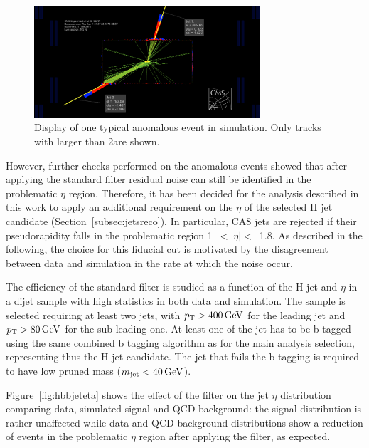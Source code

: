 \begin{figure}[!htb]
\centering
\includegraphics[width=0.75\textwidth]{Appendix/Figures/MCevent-with-tobtec.png}
\caption{Display of one typical anomalous event in simulation.
Only tracks with \pt larger than 2\GeV are shown.}
\label{fig:BadEventMC}
\end{figure}

However, further checks performed on the anomalous events showed that after applying the standard filter 
residual noise can still be identified in the problematic $\eta$ region. Therefore, it has been decided for the analysis described in this work to
apply an additional requirement on the $\eta$ of the selected H jet candidate (Section~\ref{subsec:jetsreco}).
In particular, CA8 jets are rejected if their pseudorapidity falls in the problematic region 1~$<|\eta|<$~1.8.
As described in the following, the choice for this fiducial cut is motivated by the disagreement between data and simulation in the rate
at which the noise occur.

The efficiency of the standard filter is studied as a function of the H jet \pt and $\eta$ in a dijet sample with high statistics in both data and simulation.
The sample is selected requiring at least two jets, with $p_{\mathrm{T}} > 400\,\text{Ge\hspace{-.08em}V}$ for the leading jet and $p_{\mathrm{T}} > 80\,\text{Ge\hspace{-.08em}V}$ for the sub-leading one.
At least one of the jet has to be b-tagged using the same combined b tagging algorithm as for the main analysis selection, representing thus the H jet candidate.
The jet that fails the b tagging is required to have low pruned mass ($m_{\text{jet}} < 40\,\text{Ge\hspace{-.08em}V}$).

Figure~\ref{fig:hbbjeteta} shows the effect of the filter on the jet $\eta$ distribution comparing data, simulated signal and QCD background:
the signal distribution is rather unaffected while data and QCD background distributions show a reduction of events in the problematic $\eta$ region after applying the filter, as expected.

